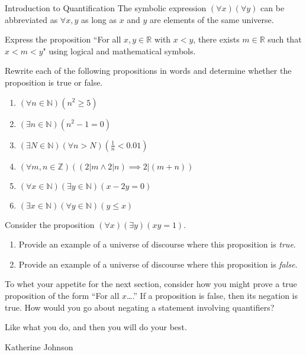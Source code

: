 \begin{section}{Introduction to Quantification}
The symbolic expression $(\forall x)(\forall y)$ can be abbreviated as $\boxed{\forall x,y}$ as long as $x$ and $y$ are elements of the same universe.

\begin{problem}
Express the proposition ``For all $x,y\in\mathbb{R}$ with $x<y$, there exists $m\in\mathbb{R}$ such that $x<m<y$" using logical and mathematical symbols.
\end{problem}

\begin{problem}
Rewrite each of the following propositions in words and determine whether the proposition is true or false.
\begin{enumerate}[label=\textrm{(\alph*)}]
\item $(\forall n \in \mathbb{N})(n^2 \geq 5)$
\item $(\exists n \in \mathbb{N})(n^2-1=0)$
\item $(\exists N \in \mathbb{N})(\forall  n > N)(\frac{1}{n} < 0.01)$
\item $(\forall m, n \in \mathbb{Z})((2|m \wedge 2|n) \implies 2|(m+n))$
\item $(\forall x \in \mathbb{N})(\exists y \in \mathbb{N})(x-2y=0)$
\item $(\exists x \in \mathbb{N})(\forall y \in \mathbb{N})(y \leq x)$
\end{enumerate}
\end{problem}

\begin{problem}
Consider the proposition $(\forall x)(\exists y)(xy=1)$.
\begin{enumerate}[label=\textrm{(\alph*)}]
\item Provide an example of a universe of discourse where this proposition is \emph{true}.
\item Provide an example of a universe of discourse where this proposition is \emph{false}.
\end{enumerate}
\end{problem}

To whet your appetite for the next section, consider how you might prove a true proposition of the form ``For all $x$\ldots.'' If a proposition is false, then its negation is true. How would you go about negating a statement involving quantifiers? 

\epigraph{Like what you do, and then you will do your best.}{Katherine Johnson}

\end{section}